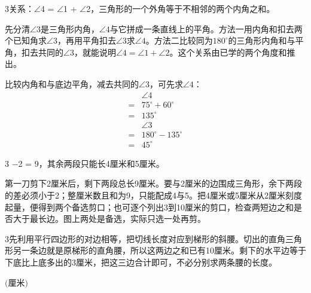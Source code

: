 \documentclass[multi=snippet,border={5bp 20bp 5bp 5bp}]{standalone}
\newenvironment{snippet}[3]{\begin{minipage}{#1bp}\color{answerred}\fontsize{#2}{#3}\selectfont\raggedright}{\end{minipage}}
\begin{document}
\begin{snippet}{505}{11.5}{14}\begin{multicols}{3}\raggedcolumns 关系：\ensuremath{\angle}4 = \ensuremath{\angle}1 + \ensuremath{\angle}2，三角形的一个外角等于不相邻的两个内角之和。\par 先分清\(\angle3\)\allowbreak 是三角形内角，\(\angle4\)\allowbreak 与它拼成一条直线上的平角。方法一用内角和扣去两个已知角求\(\angle3\)\allowbreak ，再用平角扣去\(\angle3\)\allowbreak 求\(\angle4\)\allowbreak 。方法二比较同为\(180^\circ\)\allowbreak 的三角形内角和与平角，扣去共同的\(\angle3\)\allowbreak ，就能说明\(\angle4=\angle1+\angle2\)\allowbreak 。这个关系由已学的两个角度和推出。\par 比较内角和与底边平角，减去共同的\(\angle3\)\allowbreak ，可先求\(\angle4\)\allowbreak ：\[\begin{aligned}&\angle4\\={}&75^\circ+60^\circ\\={}&135^\circ\\&\angle3\\={}&180^\circ-135^\circ\\={}&45^\circ\end{aligned}\]\end{multicols}\end{snippet}
\begin{snippet}{505}{11.5}{14}\begin{multicols}{3} \ensuremath{-}2 = 9，其余两段只能长4厘米和5厘米。\par 第一刀剪下2厘米后，剩下两段总长9厘米。要与2厘米的边围成三角形，余下两段的差必须小于2；整厘米数且和为9，只能配成4与5。把4厘米或5厘米从2厘米刻度起量，便得到两个备选剪口；也可逐个列出3到10厘米的剪口，检查两短边之和是否大于最长边。图上两处是备选，实际只选一处再剪。\end{multicols}\end{snippet}
\begin{snippet}{505}{11.5}{14}\begin{multicols}{3}\raggedcolumns 先利用平行四边形的对边相等，把切线长度对应到梯形的斜腰。切出的直角三角形另一条边就是原梯形的直角腰，所以这两边之和已有10厘米。剩下的水平边等于下底比上底多出的3厘米，把这三边合计即可，不必分别求两条腰的长度。\end{multicols}\end{snippet}
\begin{snippet}{80}{9.5}{14}\SourceSans\setlength{\mathindent}{2bp}\(\text{(厘米)}\)\end{snippet}
\end{document}
